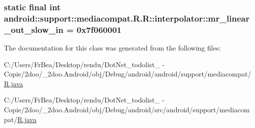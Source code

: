 \hypertarget{classandroid_1_1support_1_1mediacompat_1_1_r_1_1interpolator_2b0cc78672a3c7f98e294f04f7713008}{
\subsubsection[{mr\_\-linear\_\-out\_\-slow\_\-in}]{\setlength{\rightskip}{0pt plus 5cm}static final int android::support::mediacompat.R.R::interpolator::mr\_\-linear\_\-out\_\-slow\_\-in = 0x7f060001}}
\label{classandroid_1_1support_1_1mediacompat_1_1_r_1_1interpolator_2b0cc78672a3c7f98e294f04f7713008}




The documentation for this class was generated from the following files:\begin{CompactItemize}
\item 
C:/Users/FrBea/Desktop/rendu/DotNet\_\-todolist\_ - Copie/2doo/\_\-2doo.Android/obj/Debug/android/android/support/mediacompat/\hyperlink{android_2support_2mediacompat_2_r_8java}{R.java}\item 
C:/Users/FrBea/Desktop/rendu/DotNet\_\-todolist\_ - Copie/2doo/\_\-2doo.Android/obj/Debug/android/src/android/support/mediacompat/\hyperlink{src_2android_2support_2mediacompat_2_r_8java}{R.java}\end{CompactItemize}
